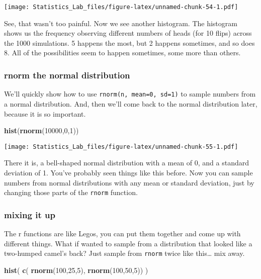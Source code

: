 \documentclass[
]{book}
\newenvironment{Shaded}{\begin{snugshade}}{\end{snugshade}}
\newcommand{\DecValTok}[1]{\textcolor[rgb]{0.00,0.00,0.81}{#1}}
\newcommand{\FunctionTok}[1]{\textcolor[rgb]{0.13,0.29,0.53}{\textbf{#1}}}
\newcommand{\NormalTok}[1]{#1}
\begin{document}
\texttt{[image: Statistics\_Lab\_files/figure-latex/unnamed-chunk-54-1.pdf]}

See, that wasn't too painful. Now we see another histogram. The
histogram shows us the frequency observing different numbers of heads
(for 10 flips) across the 1000 simulations. 5 happens the most, but 2
happens sometimes, and so does 8. All of the possibilities seem to
happen sometimes, some more than others.

\hypertarget{rnorm-the-normal-distribution}{%
\subsubsection{rnorm the normal distribution}\label{rnorm-the-normal-distribution}}

We'll quickly show how to use \texttt{rnorm(n,\ mean=0,\ sd=1)} to sample numbers
from a normal distribution. And, then we'll come back to the normal
distribution later, because it is so important.

\begin{Shaded}
\begin{Highlighting}[]
\FunctionTok{hist}\NormalTok{(}\FunctionTok{rnorm}\NormalTok{(}\DecValTok{10000}\NormalTok{,}\DecValTok{0}\NormalTok{,}\DecValTok{1}\NormalTok{))}
\end{Highlighting}
\end{Shaded}

\texttt{[image: Statistics\_Lab\_files/figure-latex/unnamed-chunk-55-1.pdf]}

There it is, a bell-shaped normal distribution with a mean of 0, and a
standard deviation of 1. You've probably seen things like this before.
Now you can sample numbers from normal distributions with any mean or
standard deviation, just by changing those parts of the \texttt{rnorm}
function.

\hypertarget{mixing-it-up}{%
\subsubsection{mixing it up}\label{mixing-it-up}}

The r functions are like Legos, you can put them together and come up
with different things. What if wanted to sample from a distribution that
looked like a two-humped camel's back? Just sample from \texttt{rnorm} twice
like this\ldots{} mix away.

\begin{Shaded}
\begin{Highlighting}[]
\FunctionTok{hist}\NormalTok{( }\FunctionTok{c}\NormalTok{( }\FunctionTok{rnorm}\NormalTok{(}\DecValTok{100}\NormalTok{,}\DecValTok{25}\NormalTok{,}\DecValTok{5}\NormalTok{), }\FunctionTok{rnorm}\NormalTok{(}\DecValTok{100}\NormalTok{,}\DecValTok{50}\NormalTok{,}\DecValTok{5}\NormalTok{)) )}
\end{Highlighting}
\end{Shaded}
\end{document}
